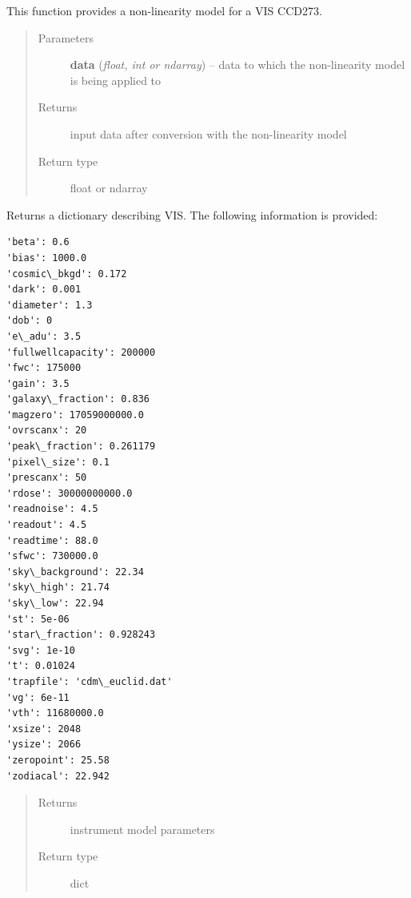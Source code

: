 \documentclass[a4paper,12pt,english]{sphinxmanual}
\begin{document}
\begin{fulllineitems}
\label{instrument:support.VISinstrumentModel.CCDnonLinearityModel}
This function provides a non-linearity model for a VIS CCD273.
\begin{quote}\begin{description}
\item[{Parameters}] \leavevmode
\textbf{data} (\emph{float, int or ndarray}) -- data to which the non-linearity model is being applied to

\item[{Returns}] \leavevmode
input data after conversion with the non-linearity model

\item[{Return type}] \leavevmode
float or ndarray

\end{description}\end{quote}

\end{fulllineitems}


\begin{fulllineitems}
\label{instrument:support.VISinstrumentModel.VISinformation}
Returns a dictionary describing VIS. The following information is provided:

\begin{Verbatim}[commandchars=\\\{\}]
'beta': 0.6
'bias': 1000.0
'cosmic\_bkgd': 0.172
'dark': 0.001
'diameter': 1.3
'dob': 0
'e\_adu': 3.5
'fullwellcapacity': 200000
'fwc': 175000
'gain': 3.5
'galaxy\_fraction': 0.836
'magzero': 17059000000.0
'ovrscanx': 20
'peak\_fraction': 0.261179
'pixel\_size': 0.1
'prescanx': 50
'rdose': 30000000000.0
'readnoise': 4.5
'readout': 4.5
'readtime': 88.0
'sfwc': 730000.0
'sky\_background': 22.34
'sky\_high': 21.74
'sky\_low': 22.94
'st': 5e-06
'star\_fraction': 0.928243
'svg': 1e-10
't': 0.01024
'trapfile': 'cdm\_euclid.dat'
'vg': 6e-11
'vth': 11680000.0
'xsize': 2048
'ysize': 2066
'zeropoint': 25.58
'zodiacal': 22.942
\end{Verbatim}
\begin{quote}\begin{description}
\item[{Returns}] \leavevmode
instrument model parameters

\item[{Return type}] \leavevmode
dict

\end{description}\end{quote}

\end{fulllineitems}
\end{document}

